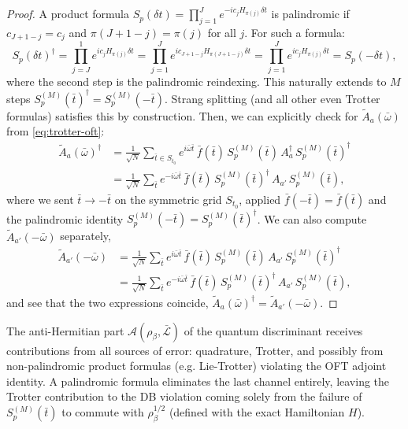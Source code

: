 \begin{proof}
    A product formula $S_p(\delta t) = \prod_{j=1}^{J} e^{-ic_j H_{\pi(j)} \delta t}$ is palindromic if $c_{J+1-j} = c_j$ and $\pi(J+1-j) = \pi(j)$ for all $j$. For such a formula:
    $$
    S_p(\delta t)^\dagger = \prod_{j=J}^{1} e^{ic_j H_{\pi(j)} \delta t} = \prod_{j=1}^{J} e^{ic_{J+1-j} H_{\pi(J+1-j)} \delta t} = \prod_{j=1}^{J} e^{ic_j H_{\pi(j)}\delta t} = S_p(-\delta t),
    $$
    where the second step is the palindromic reindexing. This naturally extends to $M$ steps $S_p^{(M)}(\bar{t})^\dagger = S_p^{(M)}(-\bar{t})$. Strang splitting (and all other even Trotter formulas) satisfies this by construction.
    Then, we can explicitly check for $\tilde{A}_a(\bar{\omega})$ from \eqref{eq:trotter-oft}:
    \begin{align*}
        \tilde{A}_a(\bar{\omega})^\dagger &= \frac{1}{\sqrt{N}} \sum_{\bar{t} \in S_{t_0}} e^{i\bar{\omega}\bar{t}}\, \bar{f}(\bar{t})\, S_p^{(M)}(\bar{t})\, A_a^\dagger\, S_p^{(M)}(\bar{t})^\dagger \\
        &= \frac{1}{\sqrt{N}} \sum_{\bar{t}} e^{-i\bar{\omega}\bar{t}}\, \bar{f}(\bar{t})\, S_p^{(M)}(\bar{t})^\dagger\, A_{a'}\, S_p^{(M)}(\bar{t}),
    \end{align*}
    where we sent $\bar{t} \to -\bar{t}$ on the symmetric grid $S_{t_0}$, applied $\bar{f}(-\bar{t}) = \bar{f}(\bar{t})$ and the palindromic identity $S_p^{(M)}(-\bar{t}) = S_p^{(M)}(\bar{t})^\dagger$. We can also compute $\tilde{A}_{a'}(-\bar{\omega})$ separately, 
    \begin{align*}
        \tilde{A}_{a'}(-\bar{\omega}) &= \frac{1}{\sqrt{N}} \sum_{\bar{t}} e^{i\bar{\omega}\bar{t}}\, \bar{f}(\bar{t})\, S_p^{(M)}(\bar{t})\, A_{a'}\, S_p^{(M)}(\bar{t})^\dagger \\
        &= \frac{1}{\sqrt{N}} \sum_{\bar{t}} e^{-i\bar{\omega}\bar{t}}\, \bar{f}(\bar{t})\, S_p^{(M)}(\bar{t})^\dagger\, A_{a'}\, S_p^{(M)}(\bar{t}),
    \end{align*}
    and see that the two expressions coincide, $\tilde{A}_a(\bar{\omega})^\dagger = \tilde{A}_{a'}(-\bar{\omega})$.
\end{proof}
The anti-Hermitian part $\mathcal{A}(\rho_\beta, \mathcal{\bar{L}})$ of the quantum discriminant receives contributions from all sources of error: quadrature, Trotter, and possibly from non-palindromic product formulas (e.g. Lie-Trotter) violating the OFT adjoint identity. A palindromic formula eliminates the last channel entirely, leaving the Trotter contribution to the DB violation coming solely from the failure of $S_p^{(M)}(\bar{t})$ to commute with $\rho_\beta^{1/2}$ (defined with the exact Hamiltonian $H$).
